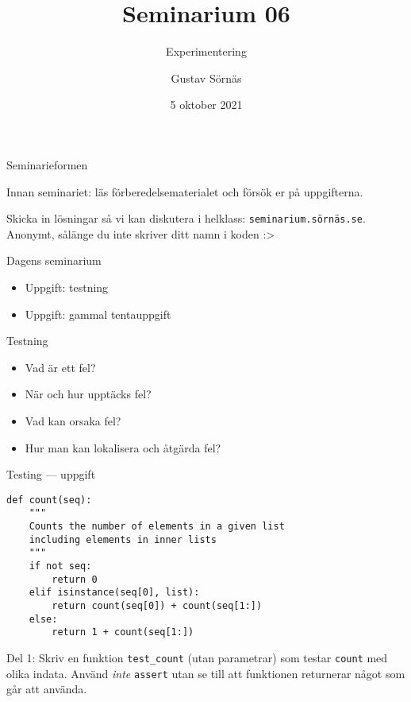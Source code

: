 \documentclass{beamer}
\title{Seminarium 06}
\subtitle{Experimentering}
\date{5 oktober 2021}
\author{Gustav Sörnäs}
\begin{document}
  \frame{\titlepage}

  \begin{frame}{Seminarieformen}

    Innan seminariet: läs förberedelsematerialet och försök er på uppgifterna.

    Skicka in lösningar så vi kan diskutera i helklass:
    \texttt{seminarium.sörnäs.se}. Anonymt, sålänge du inte skriver ditt namn i
    koden :>

  \end{frame}

  \begin{frame}{Dagens seminarium}

    \begin{itemize}
      \item Uppgift: testning
      \item Uppgift: gammal tentauppgift
    \end{itemize}

  \end{frame}

  \begin{frame}{Testning}

    \begin{itemize}
      \item Vad är ett fel?
      \item När och hur upptäcks fel?
      \item Vad kan orsaka fel?
      \item Hur man kan lokalisera och åtgärda fel?
    \end{itemize}

  \end{frame}

  \begin{frame}[fragile]{Testing --- uppgift}

    \begin{lstlisting}
def count(seq):
    """
    Counts the number of elements in a given list
    including elements in inner lists
    """
    if not seq:
        return 0
    elif isinstance(seq[0], list):
        return count(seq[0]) + count(seq[1:])
    else:
        return 1 + count(seq[1:])
    \end{lstlisting}

    Del 1: Skriv en funktion \texttt{test\_count} (utan parametrar) som testar
    \texttt{count} med olika indata. Använd \emph{inte} \texttt{assert} utan se till
    att funktionen returnerar något som går att använda.


  \end{frame}
\end{document}
